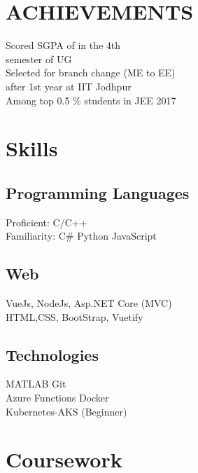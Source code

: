 \documentclass[]{deedy-resume-openfont}
\begin{document}
\begin{minipage}[t]{0.32\textwidth}
\section{ACHIEVEMENTS} 

\textbullet{} Scored SGPA of  in the 4th\\
\hspace{2.7mm}semester of UG \\
\textbullet{} Selected for branch change (ME to EE)\\
\hspace{2.7mm}after 1st year at IIT Jodhpur \\
\textbullet{} Among top 0.5 \% students in JEE 2017
\sectionsep

\section{Skills}

\subsection{Programming Languages}
Proficient: \textbullet{} C/C++\\
Familiarity: \textbullet{} C\#  \textbullet{}Python  \textbullet{}JavaScript\\
\sectionsep

\subsection{Web}
\textbullet{} VueJs, NodeJs, Asp.NET Core (MVC)\\
\textbullet{} HTML,CSS, BootStrap, Vuetify\\
\sectionsep

\subsection{Technologies}
\textbullet{} MATLAB \textbullet{} Git\\
\textbullet{} Azure Functions \textbullet{} Docker\\
\textbullet{} Kubernetes-AKS (Beginner)\\
\sectionsep
\section{Coursework}


\end{minipage}
\end{document}
